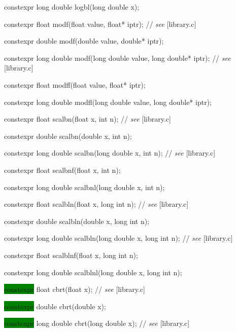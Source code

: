 \documentclass[prd,twocolumn,amsmath,amssymb,nofootinbib,eqsecnum]{revtex4-1}
\newcommand{\highlight}[1]{\colorbox{green}{\!\!\!\! #1}}
\newcommand{\oldhighlight}[1]{#1}
\newcommand{\stdcomment}[1]{{// {\it see} [#1]}}
\begin{document}
{\oldhighlight{constexpr} long double logbl(long double x);

\vspace{2ex}


\oldhighlight{constexpr}  float modf(float value, float* iptr); \stdcomment{library.c}

\oldhighlight{constexpr}  double modf(double value, double* iptr);

\oldhighlight{constexpr}  long double modf(long double value, long double* iptr); \stdcomment{library.c}

\oldhighlight{constexpr}  float modff(float value, float* iptr);

\oldhighlight{constexpr}  long double modfl(long double value, long double* iptr);

\vspace{2ex}


\oldhighlight{constexpr} float scalbn(float x, int n); \stdcomment{library.c}

\oldhighlight{constexpr} double scalbn(double x, int n);

\oldhighlight{constexpr} long double scalbn(long double x, int n); \stdcomment{library.c}

\oldhighlight{constexpr} float scalbnf(float x, int n);

\oldhighlight{constexpr} long double scalbnl(long double x, int n);

\vspace{2ex}


\oldhighlight{constexpr} float scalbln(float x, long int n); \stdcomment{library.c}

\oldhighlight{constexpr} double scalbln(double x, long int n);

\oldhighlight{constexpr} long double scalbln(long double x, long int n); \stdcomment{library.c}

\oldhighlight{constexpr} float scalblnf(float x, long int n);

\oldhighlight{constexpr} long double scalblnl(long double x, long int n);

\vspace{2ex}

\highlight{constexpr} float cbrt(float x); \stdcomment{library.c}

\highlight{constexpr} double cbrt(double x);

\highlight{constexpr} long double cbrt(long double x); \stdcomment{library.c}

}
\end{document}
